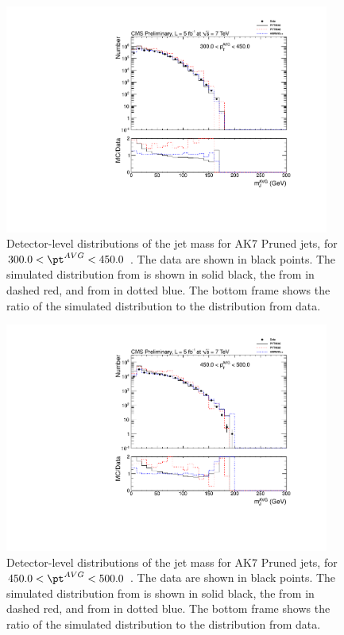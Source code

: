 \begin{figure}[htbp]
\centering
\includegraphics[width=0.95\textwidth]{figs/histAK7MjetVsPtAvg_rawDataMCComparisons_pt_5_Pruned}
\caption{Detector-level distributions of the jet mass for AK7 Pruned jets,
for $300.0 < \pt^{AVG} < 450.0$ \GeVc. The data are shown in black points.
The simulated distribution from \PYTHIA is shown in solid black, 
the from \PYTHIAEIGHT in dashed red, and from \HERWIG in dotted blue. 
The bottom frame shows the ratio of the simulated distribution
to the distribution from data. 
\label{figs:histAK7MjetVsPtAvg_rawDataMCComparisons_pt_5_Pruned}}
\end{figure}

\fi


\ifnpas

\begin{figure}[htbp]
\centering
\includegraphics[width=0.95\textwidth]{figs/histAK7MjetVsPtAvg_rawDataMCComparisons_pt_6_Pruned}
\caption{Detector-level distributions of the jet mass for AK7 Pruned jets,
for $450.0 < \pt^{AVG} < 500.0$ \GeVc. The data are shown in black points.
The simulated distribution from \PYTHIA is shown in solid black, 
the from \PYTHIAEIGHT in dashed red, and from \HERWIG in dotted blue. 
The bottom frame shows the ratio of the simulated distribution
to the distribution from data. 
\label{figs:histAK7MjetVsPtAvg_rawDataMCComparisons_pt_6_Pruned}}
\end{figure}



